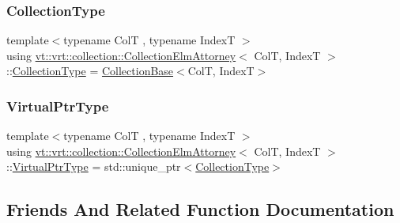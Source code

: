 \subsubsection{\texorpdfstring{Collection\+Type}{CollectionType}}
{\footnotesize\ttfamily template$<$typename ColT , typename IndexT $>$ \\
using \hyperlink{structvt_1_1vrt_1_1collection_1_1_collection_elm_attorney}{vt\+::vrt\+::collection\+::\+Collection\+Elm\+Attorney}$<$ ColT, IndexT $>$\+::\hyperlink{structvt_1_1vrt_1_1collection_1_1_collection_elm_attorney_a72d0076f73ac093f85ba5910337c6d02}{Collection\+Type} =  \hyperlink{structvt_1_1vrt_1_1collection_1_1_collection_base}{Collection\+Base}$<$ColT, IndexT$>$}

\mbox{\label{structvt_1_1vrt_1_1collection_1_1_collection_elm_attorney_a36fe2c7f590baec1038c592db59a6315}} 
\subsubsection{\texorpdfstring{Virtual\+Ptr\+Type}{VirtualPtrType}}
{\footnotesize\ttfamily template$<$typename ColT , typename IndexT $>$ \\
using \hyperlink{structvt_1_1vrt_1_1collection_1_1_collection_elm_attorney}{vt\+::vrt\+::collection\+::\+Collection\+Elm\+Attorney}$<$ ColT, IndexT $>$\+::\hyperlink{structvt_1_1vrt_1_1collection_1_1_collection_elm_attorney_a36fe2c7f590baec1038c592db59a6315}{Virtual\+Ptr\+Type} =  std\+::unique\+\_\+ptr$<$\hyperlink{structvt_1_1vrt_1_1collection_1_1_collection_elm_attorney_a72d0076f73ac093f85ba5910337c6d02}{Collection\+Type}$>$}



\subsection{Friends And Related Function Documentation}
\mbox{\label{structvt_1_1vrt_1_1collection_1_1_collection_elm_attorney_a4fb39ed9be2f0de84b237088ececde3f}} 
